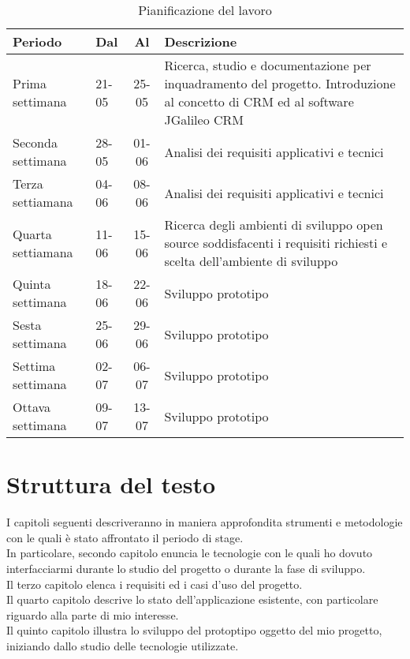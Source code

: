 \begin{table}[h]
\centering
\caption{Pianificazione del lavoro}
\label{tab:pianificazione-del-lavoro}
\begin{tabular}{|l|l|c|p{7cm}|}
\hline
Periodo  & Dal & Al &Descrizione\\ %
\hline
Prima settimana  & 21-05 & 25-05 & Ricerca, studio e documentazione per inquadramento del
progetto.
Introduzione al concetto di CRM ed al software JGalileo CRM\\
\hline
Seconda settimana  & 28-05 & 01-06 & Analisi dei requisiti applicativi e tecnici\\
\hline
Terza settiamana & 04-06 & 08-06 &Analisi dei requisiti applicativi e tecnici\\
\hline
Quarta settiamana  & 11-06 & 15-06 & Ricerca degli ambienti di sviluppo open source soddisfacenti i requisiti richiesti e scelta dell’ambiente di sviluppo\\
\hline
Quinta settimana  & 18-06 & 22-06 & Sviluppo prototipo\\
\hline
Sesta settimana  & 25-06 & 29-06 & Sviluppo prototipo\\
\hline
Settima settimana  & 02-07 & 06-07 &Sviluppo prototipo\\
\hline
Ottava settimana  & 09-07 & 13-07 &Sviluppo prototipo\\
\hline
\end{tabular}
\end{table}

\section{Struttura del testo}
I capitoli seguenti descriveranno in maniera approfondita strumenti e metodologie con le quali è stato affrontato il periodo di stage.\\
In particolare, secondo capitolo enuncia le tecnologie con le quali ho dovuto interfacciarmi durante lo studio del progetto o durante la fase di sviluppo.\\
Il terzo capitolo elenca i requisiti ed i casi d'uso del progetto.\\
Il quarto capitolo descrive lo stato dell'applicazione esistente, con particolare riguardo alla parte di mio interesse.\\
Il quinto capitolo illustra lo sviluppo del protoptipo oggetto del mio progetto, iniziando dallo studio delle tecnologie utilizzate.\\
\newpage